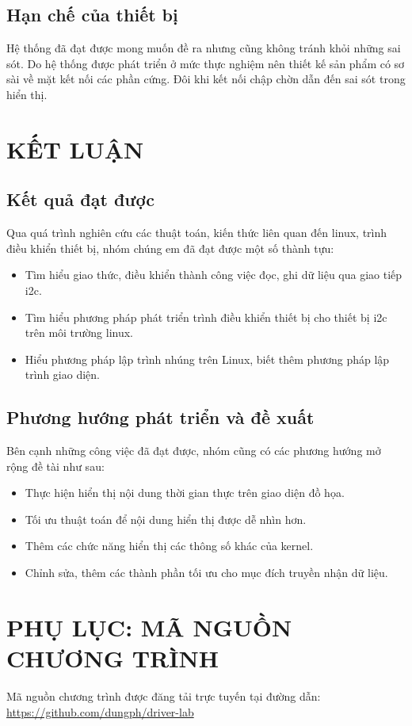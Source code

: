 \documentclass{report}
\begin{document}
\section{Hạn chế của thiết bị}
Hệ thống đã đạt được mong muốn đề ra nhưng cũng không tránh khỏi những
sai sót. Do hệ thống được phát triển ở mức thực nghiệm nên thiết kế sản phẩm có
sơ sài về mặt kết nối các phần cứng. Đôi khi kết nối chập chờn dẫn đến sai sót
trong hiển thị.
\chapter{KẾT LUẬN}
\section{Kết quả đạt được}
Qua quá trình nghiên cứu các thuật toán, kiến thức liên quan đến linux, trình điều khiển thiết bị, nhóm chúng em đã đạt được một số thành tựu:
\begin{itemize}
	\item Tìm hiểu giao thức, điều khiển thành công việc đọc, ghi dữ liệu qua giao tiếp \acrshort{i2c}.
	\item Tìm hiểu phương pháp phát triển trình điều khiển thiết bị cho thiết bị \acrshort{i2c} trên môi trường linux.
	\item Hiểu phương pháp lập trình nhúng trên Linux, biết thêm phương pháp lập trình giao diện.
\end{itemize}
\section{Phương hướng phát triển và đề xuất}
Bên cạnh những công việc đã đạt được, nhóm cũng có các phương hướng mở rộng đề tài như sau:
\begin{itemize}
	\item Thực hiện hiển thị nội dung thời gian thực trên giao diện đồ họa.
	\item Tối ưu thuật toán để nội dung hiển thị được dễ nhìn hơn.
	\item Thêm các chức năng hiển thị các thông số khác của kernel.
	\item Chỉnh sửa, thêm các thành phần tối ưu cho mục đích truyền nhận dữ liệu.
\end{itemize}

\renewcommand\bibname{TÀI LIỆU THAM KHẢO}





\chapter*{PHỤ LỤC: MÃ NGUỒN CHƯƠNG TRÌNH}

Mã nguồn chương trình được đăng tải trực tuyến tại đường dẫn: \url{https://github.com/dungph/driver-lab}
\end{document}
